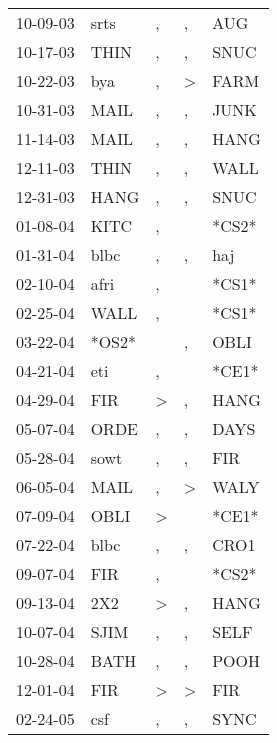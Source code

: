 \begin{supertabular}{lllll}
 10-09-03 &   srts &             , &                , &    AUG \\
 10-17-03 &   THIN &             , &                , &   SNUC \\
 10-22-03 &    bya &             , &     \textgreater &   FARM \\
 10-31-03 &   MAIL &             , &                , &   JUNK \\
 11-14-03 &   MAIL &             , &                , &   HANG \\
 12-11-03 &   THIN &             , &                , &   WALL \\
 12-31-03 &   HANG &             , &                , &   SNUC \\
 01-08-04 &   KITC &             , &                  &  *CS2* \\
 01-31-04 &   blbc &             , &                , &    haj \\
 02-10-04 &   afri &             , &                  &  *CS1* \\
 02-25-04 &   WALL &             , &                  &  *CS1* \\
 03-22-04 &  *OS2* &               &                , &   OBLI \\
 04-21-04 &    eti &             , &                  &  *CE1* \\
 04-29-04 &    FIR &  \textgreater &                , &   HANG \\
 05-07-04 &   ORDE &             , &                , &   DAYS \\
 05-28-04 &   sowt &             , &                , &    FIR \\
 06-05-04 &   MAIL &             , &     \textgreater &   WALY \\
 07-09-04 &   OBLI &  \textgreater &                  &  *CE1* \\
 07-22-04 &   blbc &             , &                , &   CRO1 \\
 09-07-04 &    FIR &             , &                  &  *CS2* \\
 09-13-04 &    2X2 &  \textgreater &                , &   HANG \\
 10-07-04 &   SJIM &             , &                , &   SELF \\
 10-28-04 &   BATH &             , &                , &   POOH \\
 12-01-04 &    FIR &  \textgreater &     \textgreater &    FIR \\
 02-24-05 &    csf &             , &                , &   SYNC \\

\end{supertabular}
